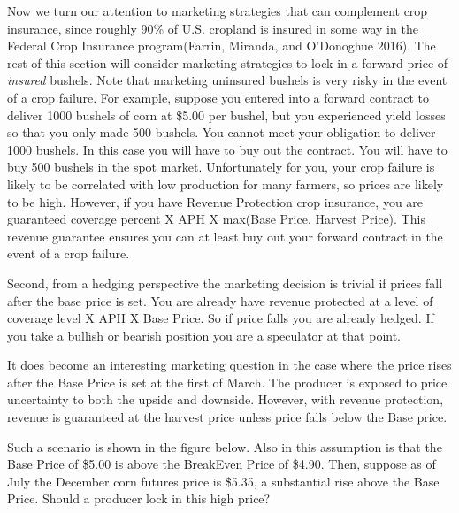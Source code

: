 \documentclass[
  letterpaper,
  DIV=11,
  numbers=noendperiod]{scrreprt}
\begin{document}
Now we turn our attention to marketing strategies that can complement
crop insurance, since roughly 90\% of U.S. cropland is insured in some
way in the Federal Crop Insurance program(Farrin, Miranda, and
O'Donoghue 2016). The rest of this section will consider marketing
strategies to lock in a forward price of \emph{insured} bushels. Note
that marketing uninsured bushels is very risky in the event of a crop
failure. For example, suppose you entered into a forward contract to
deliver 1000 bushels of corn at \$5.00 per bushel, but you experienced
yield losses so that you only made 500 bushels. You cannot meet your
obligation to deliver 1000 bushels. In this case you will have to buy
out the contract. You will have to buy 500 bushels in the spot market.
Unfortunately for you, your crop failure is likely to be correlated with
low production for many farmers, so prices are likely to be high.
However, if you have Revenue Protection crop insurance, you are
guaranteed coverage percent X APH X max(Base Price, Harvest Price). This
revenue guarantee ensures you can at least buy out your forward contract
in the event of a crop failure.

Second, from a hedging perspective the marketing decision is trivial if
prices fall after the base price is set. You are already have revenue
protected at a level of coverage level X APH X Base Price. So if price
falls you are already hedged. If you take a bullish or bearish position
you are a speculator at that point.

It does become an interesting marketing question in the case where the
price rises after the Base Price is set at the first of March. The
producer is exposed to price uncertainty to both the upside and
downside. However, with revenue protection, revenue is guaranteed at the
harvest price unless price falls below the Base price.

Such a scenario is shown in the figure below. Also in this assumption is
that the Base Price of \$5.00 is above the BreakEven Price of \$4.90.
Then, suppose as of July the December corn futures price is \$5.35, a
substantial rise above the Base Price. Should a producer lock in this
high price?
\end{document}
